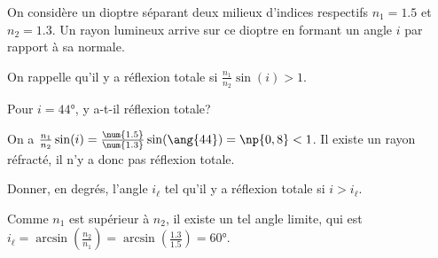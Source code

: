 	\titreEntrainementFacultatif	{}
	\hauteurLargeurCadreReponse		{7mm}{3cm}
	\initialisationEntrainement

	On considère un dioptre séparant deux milieux d'indices respectifs $n_1=\num{1.5}$ et $n_2=\num{1.3}$.  Un rayon lumineux arrive sur ce dioptre en formant un angle $i$ par rapport à sa normale. 
	
	On rappelle qu'il y a réflexion totale si $\frac{n_1}{n_2}\sin(i)>1$.
	
	
	\debutEntrainement
	
	
	
	\begin{enonce}
		Pour $i=\ang{44}$, y a-t-il réflexion totale? 
	\end{enonce}
	
	
	\begin{corrige}
		On a $\frac{n_1}{n_2}\sin(i)=\frac{\num{1.5}}{\num{1.3}}\sin(\ang{44})=\np{0,8}<1$. Il existe un rayon réfracté, il n'y a donc pas réflexion totale. 
	\end{corrige}
	
	
	
	
	\begin{enonce}
		Donner, en degrés, l'angle $i_\ell$ tel qu'il y a réflexion totale si $i>i_\ell$.
	\end{enonce}
	
	
	\begin{corrige}
		Comme $n_1$ est supérieur à $n_2$, il existe un tel angle limite, qui est $i_\ell=\arcsin\left(\frac{n_2}{n_1}\right)=\arcsin\left(\frac{\num{1.3}}{\num{1.5}}\right)=\ang{60}$. 
	\end{corrige}
	
